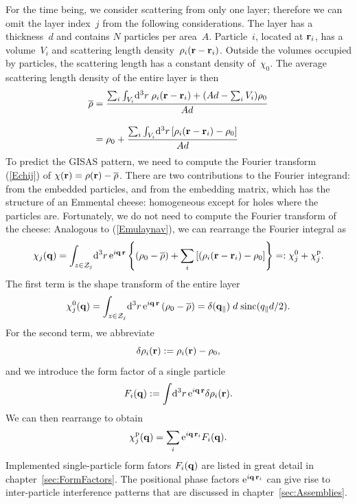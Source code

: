 For the time being,
we consider scattering from only one layer;
therefore we can omit the layer index~$j$ from the following considerations.
The layer has a thickness~$d$ and contains $N$ particles per area~$A$.
Particle~$i$, located at $\mathbf{r}_i$,
has a volume~$V_i$ and scattering length density~$\rho_i(\mathbf{r}-\mathbf{r}_i)$.
Outside the volumes occupied by particles,
the scattering length has a constant density of~$\chi_0$.
The average scattering length density of the entire layer is then
\begin{equation}\label{Emulaynav}
  \begin{split}
  \overline{\rho}
      &= \frac{\sum_i \int_{V_i}\!{\rm d}^3r\; \rho_i(\mathbf{r}-\mathbf{r}_i)
               + (Ad-\sum_i V_i)\rho_0}
             {Ad}\\[1em]
      &= \rho_0 + \frac{\sum_i \int_{V_i}\!{\rm d}^3r\, [\rho_i(\mathbf{r}-\mathbf{r}_i)-\rho_0]}
             {Ad}
  \end{split}
\end{equation}
To predict the GISAS pattern,
we need to compute the Fourier transform (\ref{Echij}) of
$\chi(\mathbf{r})=\rho(\mathbf{r})-\overline{\rho}$.
There are two contributions to the Fourier integrand:
from the embedded particles, and from the embedding matrix,
which has the structure of an Emmental cheese:
homogeneous except for holes where the particles are.
Fortunately, we do not need to compute the Fourier transform
of the cheese:
Analogous to (\ref{Emulaynav}),
we can rearrange the Fourier integral as
\begin{equation}\label{Echijre}
  \chi_j(\mathbf{q})
  = \int_{z\in\mathcal{Z}_j}\!{\rm d}^3r\, {\rm e}^{i\mathbf{q}\,\mathbf{r}}
    \left\{ \left(\rho_0-\overline{\rho}\right)
           + \sum_i \left[(\rho_i(\mathbf{r}-\mathbf{r}_i)-\rho_0\right] \right\}
  =: \chi^0_j + \chi^\text{p}_j.
\end{equation}
The first term is the shape transform of the entire layer
\begin{equation}
  \chi^0_j(\mathbf{q})
   = \int_{z\in\mathcal{Z}_j}\!{\rm d}^3r\, {\rm e}^{i\mathbf{q}\,\mathbf{r}}
      \left(\rho_0-\overline{\rho}\right)
   = \delta(\mathbf{q}_\parallel)\;d\;\text{sinc}(q_\parallel d/2).
\end{equation}
For the second term,
we abbreviate
\begin{equation}
  \delta\rho_i(\mathbf{r}):=\rho_i(\mathbf{r})-\rho_0,
\end{equation}
and we introduce the form factor of a single particle
\begin{equation}
  F_i(\mathbf{q}) := \int\!{\rm d}^3r\, {\rm e}^{i\mathbf{q}\,\mathbf{r}} \delta\rho_i(\mathbf{r}).
\end{equation}
We can then rearrange to obtain
\begin{equation}
  \chi^\text{p}_j(\mathbf{q})
  = \sum_i {\rm e}^{i\mathbf{q}\,\mathbf{r}_i} F_i(\mathbf{q}).
\end{equation}
Implemented single-particle form fators $F_i(\mathbf{q})$
are listed in great detail in chapter~\ref{sec:FormFactors}.
The positional phase factors ${\rm e}^{i\mathbf{q}\,\mathbf{r}_i}$
can give rise to inter-particle interference patterns
that are discussed in chapter~\ref{sec:Assemblies}.

